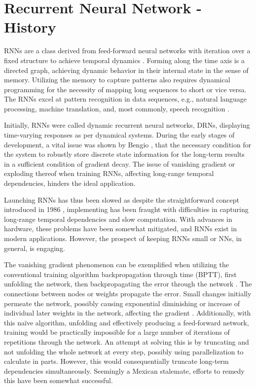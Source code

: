 \section{Recurrent Neural Network - History}

RNNs are a class derived from feed-forward neural networks with iteration over a fixed structure to achieve temporal dynamics \cite{DRNNS}. Forming along the time axis is a directed graph, achieving dynamic behavior in their internal state in the sense of memory. Utilizing the memory to capture patterns also requires dynamical programming for the necessity of mapping long sequences to short or vice versa. The RNNs excel at pattern recognition in data sequences, e.g., natural language processing, machine translation, and, most commonly, speech recognition \cite{handwriting}. 

Initially, RNNs were called dynamic recurrent neural networks, DRNs, displaying time-varying responses as per dynamical systems. During the early stages of development, a vital issue was shown by Bengio \cite{ben}, that the necessary condition for the system to robustly store discrete state information for the long-term results in a sufficient condition of gradient decay. The issue of vanishing gradient \cite{hoch} or exploding thereof when training RNNs, affecting long-range temporal dependencies, hinders the ideal application. 

Launching RNNs has thus been slowed as despite the straightforward concept introduced in 1986 \cite{RNN1}, implementing has been fraught with difficulties in capturing long-range temporal dependencies and slow computation. With advances in hardware, these problems have been somewhat mitigated, and RNNs exist in modern applications. However, the prospect of keeping RNNs small or NNs, in general, is engaging.

The vanishing gradient phenomenon can be exemplified when utilizing the conventional training algorithm backpropagation through time (BPTT), first unfolding the network, then backpropagating the error through the network \cite{DRNNS}. The connections between nodes or weights propagate the error. Small changes initially permeate the network, possibly causing exponential diminishing or increase of individual later weights in the network, affecting the gradient \cite{field}. Additionally, with this naïve algorithm, unfolding and effectively producing a feed-forward network, training would be practically impossible for a large number of iterations of repetitions through the network. An attempt at solving this is by truncating and not unfolding the whole network at every step, possibly using parallelization to calculate in parts. However, this would consequentially truncate long-term dependencies simultaneously. Seemingly a Mexican stalemate, efforts to remedy this have been somewhat successful. 

